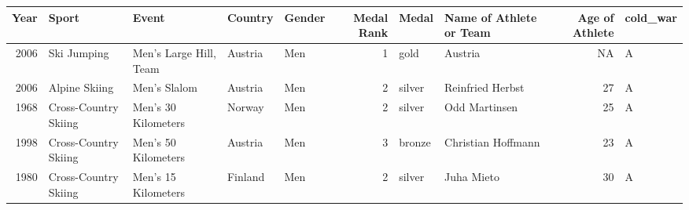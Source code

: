 \documentclass[]{book}
\theoremstyle{definition}
\theoremstyle{definition}
\theoremstyle{definition}
\theoremstyle{remark}
\begin{document}
\begin{tabular}{r|l|l|l|l|r|l|l|r|l}
\hline
Year & Sport & Event & Country & Gender & Medal Rank & Medal & Name of Athlete or Team & Age of Athlete & cold\_war\\
\hline
2006 & Ski Jumping & Men's Large Hill, Team & Austria & Men & 1 & gold & Austria & NA & A\\
\hline
2006 & Alpine Skiing & Men's Slalom & Austria & Men & 2 & silver & Reinfried Herbst & 27 & A\\
\hline
1968 & Cross-Country Skiing & Men's 30 Kilometers & Norway & Men & 2 & silver & Odd Martinsen & 25 & A\\
\hline
1998 & Cross-Country Skiing & Men's 50 Kilometers & Austria & Men & 3 & bronze & Christian Hoffmann & 23 & A\\
\hline
1980 & Cross-Country Skiing & Men's 15 Kilometers & Finland & Men & 2 & silver & Juha Mieto & 30 & A\\
\hline
\end{tabular}
\end{document}
